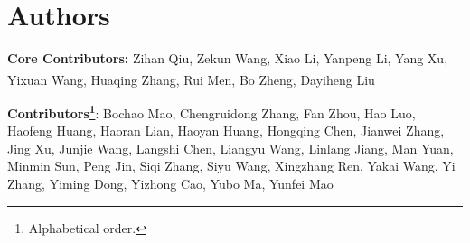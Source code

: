 \section{Authors}

\textbf{Core Contributors:} Zihan Qiu, Zekun Wang, Xiao Li, Yanpeng Li, Yang Xu, Yixuan Wang, Huaqing Zhang, Rui Men, Bo Zheng\textsuperscript{\Letter}, Dayiheng Liu\textsuperscript{\Letter} 

\renewcommand{\thefootnote}{\Letter}
\renewcommand{\thefootnote}{\arabic{footnote}}

\textbf{Contributors\footnote{Alphabetical order.}}: Bochao Mao, Chengruidong Zhang, Fan Zhou, Hao Luo, Haofeng Huang, Haoran Lian, Haoyan Huang, Hongqing Chen, Jianwei Zhang, Jing Xu, Junjie Wang, Langshi Chen, Liangyu Wang, Linlang Jiang, Man Yuan, Minmin Sun, Peng Jin, Siqi Zhang, Siyu Wang, Xingzhang Ren, Yakai Wang, Yi Zhang, Yiming Dong, Yizhong Cao, Yubo Ma, Yunfei Mao